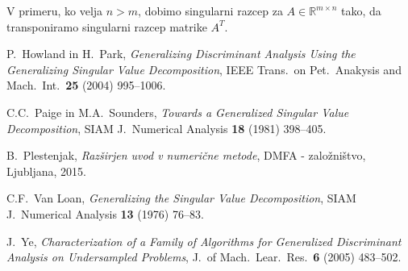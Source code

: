 \documentclass[mat1]{article}
\theoremstyle{definition}
\begin{document}
V primeru, ko velja $n>m$, dobimo singularni razcep za $A \in \mathbb{R}^{m \times n}$ tako, da transponiramo singularni razcep matrike $A^T$.

\begin{thebibliography}{99}

P.~Howland in H.~Park, \emph{Generalizing Discriminant Analysis Using the Generalizing Singular Value Decomposition}, IEEE Trans.\ on Pet.\ Anakysis and Mach.\ Int.\ \textbf{25} (2004) 995--1006.

C.C.~Paige in M.A.~Sounders, \emph{Towards a Generalized Singular Value Decomposition}, SIAM J.\ Numerical Analysis \textbf{18} (1981) 398--405.

B.~Plestenjak, \emph{Razširjen uvod v numerične metode}, DMFA - založništvo, Ljubljana, 2015.

C.F.~Van Loan, \emph{Generalizing the Singular Value Decomposition}, SIAM J.\ Numerical Analysis \textbf{13} (1976) 76--83.

J.~Ye, \emph{Characterization of a Family of Algorithms for Generalized Discriminant Analysis on Undersampled Problems}, J.\ of Mach.\ Lear.\ Res.\ \textbf{6} (2005) 483--502.













\end{thebibliography}
\end{document}

